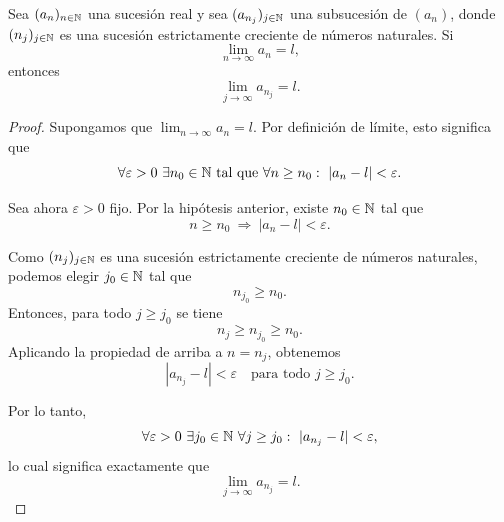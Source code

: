 \begin{prop}
Sea $(a_n)_{n\in\mathbb{N}}$ una sucesión real y sea $(a_{n_j})_{j\in\mathbb{N}}$ una subsucesión de $(a_n)$,
donde $(n_j)_{j\in\mathbb{N}}$ es una sucesión estrictamente creciente de números naturales.
Si
\[
\lim_{n\to\infty} a_n = l,
\]
entonces
\[
\lim_{j\to\infty} a_{n_j} = l.
\]
\end{prop}

\begin{proof}
Supongamos que $\lim_{n\to\infty} a_n = l$. Por definición de límite, esto significa que
\[
\forall \varepsilon > 0 \ \exists n_0 \in \N \ \text{tal que} \ \forall n \ge n_0:
\ |a_n - l| < \varepsilon.
\]

Sea ahora $\varepsilon > 0$ fijo. Por la hipótesis anterior, existe $n_0 \in \mathbb{N}$ tal que
\[
n \ge n_0 \ \Rightarrow\ |a_n - l| < \varepsilon.
\]

Como $(n_j)_{j\in\mathbb{N}}$ es una sucesión estrictamente creciente de números naturales,
podemos elegir $j_0 \in \mathbb{N}$ tal que
\[
n_{j_0} \ge n_0.
\]
Entonces, para todo $j \ge j_0$ se tiene
\[
n_j \ge n_{j_0} \ge n_0.
\]
Aplicando la propiedad de arriba a $n = n_j$, obtenemos
\[
|a_{n_j} - l| < \varepsilon \quad \text{para todo } j \ge j_0.
\]

Por lo tanto,
\[
\forall \varepsilon > 0 \ \exists j_0 \in \mathbb{N} \ \forall j \ge j_0:\ |a_{n_j} - l| < \varepsilon,
\]
lo cual significa exactamente que
\[
\lim_{j\to\infty} a_{n_j} = l.
\]
\end{proof}